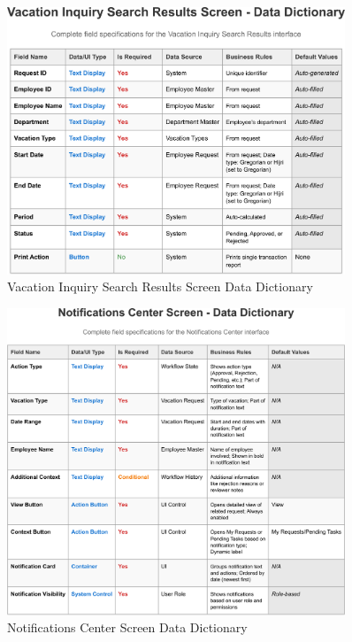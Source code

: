 \documentclass[12pt,a4paper]{article}
\begin{document}
\begin{figure}[H]
\centering
\includegraphics[width=0.9\textwidth]{Data-Dictionary/Screen-Data-Dictionaries/Vacation-Inquiry-Search-Results-Screen-Data-Dictionary/Vacation-Inquiry-Search-Results-Screen-Data-Dictionary-1.png}
\caption{Vacation Inquiry Search Results Screen Data Dictionary}
\label{fig:inquiry-search-results-data-dict}
\end{figure}

\begin{figure}[H]
\centering
\includegraphics[width=0.9\textwidth]{Data-Dictionary/Screen-Data-Dictionaries/Notifications-Center-Screen-Data-Dictionary/Notifications-Center-Screen-Data-Dictionary-1.png}
\caption{Notifications Center Screen Data Dictionary}
\label{fig:notifications-center-data-dict}
\end{figure}
\end{document}
